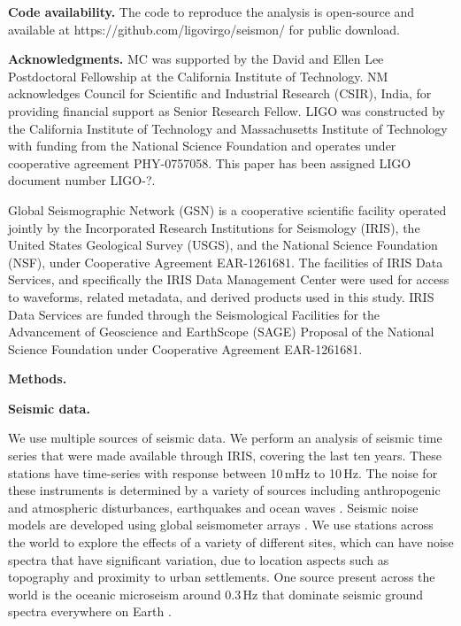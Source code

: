 \documentclass[preprint, aps, showpacs]{revtex4-1}
\begin{document}
\textbf{Code availability.}
The code to reproduce the analysis is open-source and available at https://github.com/ligovirgo/seismon/ for public download.

\textbf{Acknowledgments.}
MC was supported by the David and Ellen Lee Postdoctoral Fellowship at the California Institute of Technology.
NM acknowledges Council for Scientific and Industrial Research (CSIR), India, for providing financial support as Senior Research Fellow.  
LIGO was constructed by the California Institute of Technology and Massachusetts Institute of Technology with funding from the National Science Foundation and operates under cooperative agreement PHY-0757058.
This paper has been assigned LIGO document number LIGO-?.

Global Seismographic Network (GSN) is a cooperative scientific facility operated jointly by the Incorporated Research Institutions for Seismology (IRIS), the United States Geological Survey (USGS), and the National Science Foundation (NSF), under Cooperative Agreement EAR-1261681.
The facilities of IRIS Data Services, and specifically the IRIS Data Management Center were used for access to waveforms, related metadata, and derived products used in this study. IRIS Data Services are funded through the Seismological Facilities for the Advancement of Geoscience and EarthScope (SAGE) Proposal of the National Science Foundation under Cooperative Agreement EAR-1261681.




\textbf{Methods.}

\textbf{Seismic data.}

We use multiple sources of seismic data.
We perform an analysis of seismic time series that were made available through IRIS, covering the last ten years.
These stations have time-series with response between 10\,mHz to 10\,Hz.
The noise for these instruments is determined by a variety of sources including anthropogenic and atmospheric disturbances, earthquakes and ocean waves \cite{BCB2006}. 
Seismic noise models are developed using global seismometer arrays  \cite{Pet1993,BDE2004,McEA2009}.
We use stations across the world to explore the effects of a variety of different sites, which can have noise spectra that have significant variation, due to location aspects such as topography and proximity to urban settlements.
One source present across the world is the oceanic microseism around 0.3\,Hz that dominate seismic ground spectra everywhere on Earth \cite{HMS1963,ToLa1968,Ces1994,FKK1998}. 
\end{document}
